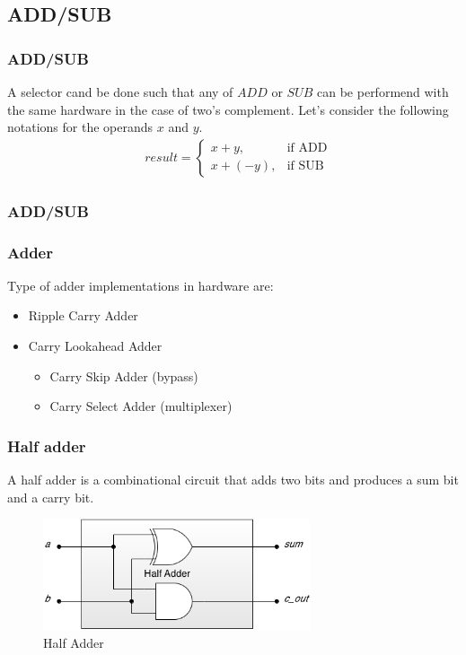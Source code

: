 \subsection{ADD/SUB}

\begin{frame}
    \frametitle{ADD/SUB}
    A selector cand be done such that any of $ADD$ or $SUB$ can be performend with the same hardware in the case of two's complement.
    Let's consider the following notations for the operands $x$ and $y$.
    \begin{equation}
        \begin{aligned}
            &result=
                \begin{cases}
                    x+y,& \text{if ADD}\\
                    x+(-y), & \text{if SUB}
                \end{cases}
        \end{aligned}
    \end{equation}
\end{frame}

\begin{frame}
    \frametitle{ADD/SUB}
\end{frame}

\begin{frame}
    \frametitle{Adder}
    Type of adder implementations in hardware are:
    \begin{itemize}
        \item Ripple Carry Adder
        \item Carry Lookahead Adder
            \begin{itemize}
                \item Carry Skip Adder (bypass)
                \item Carry Select Adder (multiplexer)
            \end{itemize}
    \end{itemize}
\end{frame}

\begin{frame}
    \frametitle{Half adder}
    A half adder is a combinational circuit that adds two bits and produces a sum bit and a carry bit.
    \begin{figure}
        \centering
        \includegraphics[width=0.7\textwidth]{media/half-adder-gates.png}
        \caption{Half Adder}
    \end{figure}
\end{frame}


